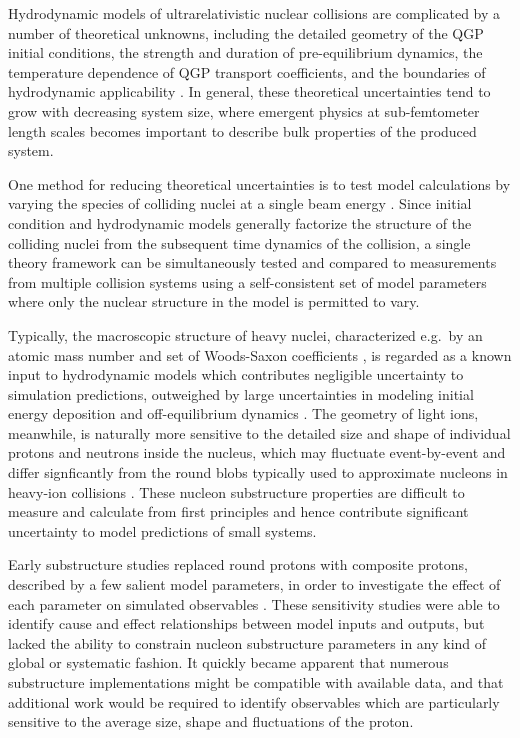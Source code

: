 \documentclass[aps,prc,reprint,amsmath,nofootinbib]{revtex4-1}
\begin{document}
Hydrodynamic models of ultrarelativistic nuclear collisions are complicated by a number of theoretical unknowns, including the detailed geometry of the QGP initial conditions, the strength and duration of pre-equilibrium dynamics, the temperature dependence of QGP transport coefficients, and the boundaries of hydrodynamic applicability \cite{Niemi:2014lha, deSouza:2015ena, Ollitrault:2012cm, Song:2012ua}.
In general, these theoretical uncertainties tend to grow with decreasing system size, where emergent physics at sub-femtometer length scales becomes important to describe bulk properties of the produced system.

One method for reducing theoretical uncertainties is to test model calculations by varying the species of colliding nuclei at a single beam energy \cite{Adare:2015bua, Schenke:2014tga, Aidala:2018mcw, Adare:2017wlc, Adamczyk:2015obl, Shen:2016zpp, Aidala:2017ajz, Adare:2006ti}.
Since initial condition and hydrodynamic models generally factorize the structure of the colliding nuclei from the subsequent time dynamics of the collision, a single theory framework can be simultaneously tested and compared to measurements from multiple collision systems using a self-consistent set of model parameters where only the nuclear structure in the model is permitted to vary.

Typically, the macroscopic structure of heavy nuclei, characterized e.g.\ by an atomic mass number and set of Woods-Saxon coefficients \cite{MOLLER1995185, DEVRIES1987495}, is regarded as a known input to hydrodynamic models which contributes negligible uncertainty to simulation predictions, outweighed by large uncertainties in modeling initial energy deposition and off-equilibrium dynamics \cite{Niemi:2014lha, Song:2011hk, Retinskaya:2013gca, Liu:2015nwa, Kurkela:2016vts}.
The geometry of light ions, meanwhile, is naturally more sensitive to the detailed size and shape of individual protons and neutrons inside the nucleus, which may fluctuate event-by-event and differ signficantly from the round blobs typically used to approximate nucleons in heavy-ion collisions \cite{Schenke:2014zha, Welsh:2016siu, Moreland:2017kdx, Schenke:2014gaa, Schlichting:2014ipa}.
These nucleon substructure properties are difficult to measure and calculate from first principles and hence contribute significant uncertainty to model predictions of small systems.

Early substructure studies replaced round protons with composite protons, described by a few salient model parameters, in order to investigate the effect of each parameter on simulated observables \cite{Adler:2013aqf, Mitchell:2016jio, Welsh:2016siu, Broniowski:2016pvx, Bozek:2017jog}.
These sensitivity studies were able to identify cause and effect relationships between model inputs and outputs, but lacked the ability to constrain nucleon substructure parameters in any kind of global or systematic fashion.
It quickly became apparent that numerous substructure implementations might be compatible with available data, and that additional work would be required to identify observables which are particularly sensitive to the average size, shape and fluctuations of the proton.
\end{document}
